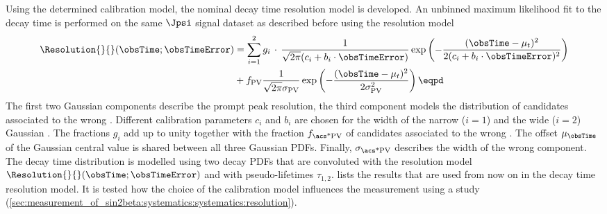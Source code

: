 Using the determined calibration model, the nominal decay time resolution model
is developed. An unbinned maximum likelihood fit to the \Bd decay time is
performed on the same $\Jpsi$ signal \sweighted dataset as described before
using the resolution model
%
\begin{equation}\label{eq:measurement_of_sin2beta:resolution_and_acceptance:resolution}
\begin{split}
  \Resolution{}{}\!\left(\obsTime;\obsTimeError\right)
  &= \sum_{i=1}^{2}{g_i\,\cdot\,\frac{1}{\sqrt{2\pi}(c_i + b_i \cdot \obsTimeError)}\exp\left(-\frac{(\obsTime - \mu_t)^2}{2(c_i + b_i \cdot \obsTimeError)^2}\right)}\\
  &+ f_{\text{PV}} \frac{1}{\sqrt{2\pi} \sigma_{\text{PV}}} \exp\left(-\frac{(\obsTime - \mu_t)^2}{2 \sigma_{\text{PV}}^2}\right) \eqpd
\end{split}
\end{equation}
%
The first two Gaussian components describe the prompt peak resolution, the third
component models the distribution of candidates associated to the wrong \PV.
Different calibration parameters $c_i$ and $b_i$ are chosen for the width of the
narrow ($i=1$) and the wide ($i=2$) Gaussian \PDF. The fractions $g_i$ add up to
unity together with the fraction $f_\text{\acs*{PV}}$ of candidates associated
to the wrong \PV. The offset $\mu_{\obsTime}$ of the Gaussian central value is
shared between all three Gaussian \acp{PDF}. Finally,
$\sigma_{\text{\acs*{PV}}}$ describes the width of the wrong \PV component. The
decay time distribution is modelled using two decay \acp{PDF} that are
convoluted with the resolution model
$\Resolution{}{}\!\left(\obsTime;\obsTimeError\right)$ and with pseudo-lifetimes
$\tau_{1,2}$.
lists the results that are used from now on in the decay time resolution model.
It is tested how the choice of the calibration model influences the measurement
using a \ToyMC study
(\cref{sec:measurement_of_sin2beta:systematics:systematics:resolution}).
%
